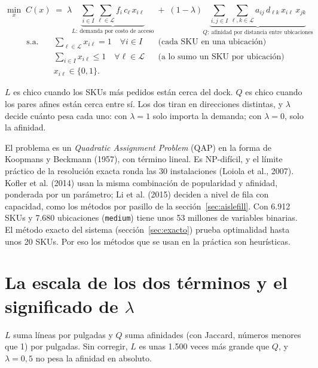 \documentclass[11pt,a4paper,oneside]{report}
\newcommand{\code}[1]{\texttt{\small #1}}
\begin{document}
\begin{equation}
\min_{x} \; C(x) \;=\; \lambda \underbrace{\sum_{i \in I} \sum_{\ell \in \mathcal{L}} f_i\, c_\ell\, x_{i\ell}}_{L:\ \text{demanda por costo de acceso}}
\;+\; (1-\lambda) \underbrace{\sum_{i,j \in I} \sum_{\ell, k \in \mathcal{L}} a_{ij}\, d_{\ell k}\, x_{i\ell}\, x_{jk}}_{Q:\ \text{afinidad por distancia entre ubicaciones}}
\label{eq:qap}
\end{equation}
\begin{align*}
\text{s.a.}\quad & \sum_{\ell \in \mathcal{L}} x_{i\ell} = 1 \quad \forall i \in I && \text{(cada SKU en una ubicación)}\\
& \sum_{i \in I} x_{i\ell} \le 1 \quad \forall \ell \in \mathcal{L} && \text{(a lo sumo un SKU por ubicación)}\\
& x_{i\ell} \in \{0, 1\}.
\end{align*}

$L$ es chico cuando los SKUs más pedidos están cerca del dock. $Q$ es chico cuando los pares
afines están cerca entre sí. Los dos tiran en direcciones distintas, y $\lambda$ decide cuánto
pesa cada uno: con $\lambda = 1$ solo importa la demanda; con $\lambda = 0$, solo la
afinidad.

El problema es un \emph{Quadratic Assignment Problem} (QAP) en la forma de Koopmans y
Beckmann (1957), con término lineal. Es NP-difícil, y el límite práctico de la resolución
exacta ronda las 30 instalaciones (Loiola et al., 2007). Kofler et al. (2014) usan la misma
combinación de popularidad y afinidad, ponderada por un parámetro; Li et al. (2015) deciden a
nivel de fila con capacidad, como los métodos por pasillo de la
sección~\ref{sec:aislefill}. Con 6.912 SKUs y 7.680 ubicaciones (\code{medium}) tiene unos 53 millones de
variables binarias. El método exacto del sistema (sección~\ref{sec:exacto}) prueba
optimalidad hasta unos 20 SKUs. Por eso los métodos que se usan en la práctica son
heurísticas.

\section{La escala de los dos términos y el significado de $\lambda$}
\label{sec:escala}

$L$ suma líneas por pulgadas y $Q$ suma afinidades (con Jaccard, números menores que 1) por
pulgadas. Sin corregir, $L$ es unas 1.500 veces más grande que $Q$, y $\lambda = 0{,}5$ no
pesa la afinidad en absoluto.
\end{document}
